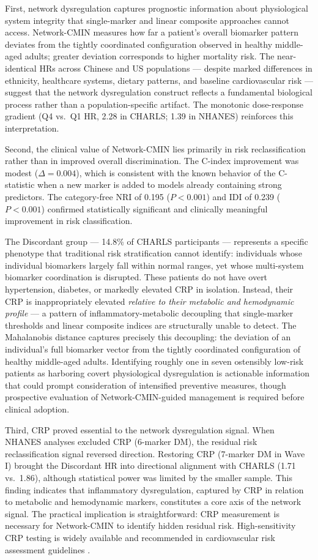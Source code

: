 \documentclass[11pt,a4paper]{article}
\begin{document}
First, network dysregulation captures prognostic information about physiological system integrity that single-marker and linear composite approaches cannot access. Network-CMIN measures how far a patient's overall biomarker pattern deviates from the tightly coordinated configuration observed in healthy middle-aged adults; greater deviation corresponds to higher mortality risk. The near-identical HRs across Chinese and US populations --- despite marked differences in ethnicity, healthcare systems, dietary patterns, and baseline cardiovascular risk --- suggest that the network dysregulation construct reflects a fundamental biological process rather than a population-specific artifact. The monotonic dose-response gradient (Q4 vs.\ Q1 HR, 2.28 in CHARLS; 1.39 in NHANES) reinforces this interpretation.

Second, the clinical value of Network-CMIN lies primarily in risk reclassification rather than in improved overall discrimination. The C-index improvement was modest ($\Delta = 0.004$), which is consistent with the known behavior of the C-statistic when a new marker is added to models already containing strong predictors. The category-free NRI of 0.195 ($P < 0.001$) and IDI of 0.239 ($P < 0.001$) confirmed statistically significant and clinically meaningful improvement in risk classification.

The Discordant group --- 14.8\% of CHARLS participants --- represents a specific phenotype that traditional risk stratification cannot identify: individuals whose individual biomarkers largely fall within normal ranges, yet whose multi-system biomarker coordination is disrupted. These patients do not have overt hypertension, diabetes, or markedly elevated CRP in isolation. Instead, their CRP is inappropriately elevated \textit{relative to their metabolic and hemodynamic profile} --- a pattern of inflammatory-metabolic decoupling that single-marker thresholds and linear composite indices are structurally unable to detect. The Mahalanobis distance captures precisely this decoupling: the deviation of an individual's full biomarker vector from the tightly coordinated configuration of healthy middle-aged adults. Identifying roughly one in seven ostensibly low-risk patients as harboring covert physiological dysregulation is actionable information that could prompt consideration of intensified preventive measures, though prospective evaluation of Network-CMIN-guided management is required before clinical adoption.

Third, CRP proved essential to the network dysregulation signal. When NHANES analyses excluded CRP (6-marker DM), the residual risk reclassification signal reversed direction. Restoring CRP (7-marker DM in Wave I) brought the Discordant HR into directional alignment with CHARLS (1.71 vs.\ 1.86), although statistical power was limited by the smaller sample. This finding indicates that inflammatory dysregulation, captured by CRP in relation to metabolic and hemodynamic markers, constitutes a core axis of the network signal. The practical implication is straightforward: CRP measurement is necessary for Network-CMIN to identify hidden residual risk. High-sensitivity CRP testing is widely available and recommended in cardiovascular risk assessment guidelines \cite{ridker2017cantos}.
\end{document}
